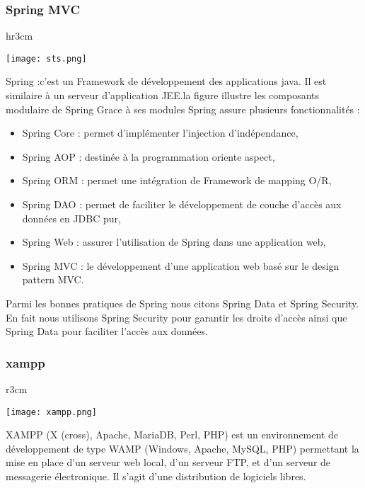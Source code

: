 \documentclass[../rapportdestage.tex]{subfiles}
\begin{document}
		
				
		
	
		
		
		\subsubsection{Spring MVC}
		
   \begin{wrapfigure}[4]{hr}{3cm}

\texttt{[image: sts.png]}
  \end{wrapfigure}
	
		Spring :c’est un Framework de développement des applications java. Il est similaire à un serveur d’application JEE.la figure  illustre les composants modulaire de Spring
		Grace à ses modules Spring assure plusieurs fonctionnalités :
		\begin{itemize}
\item Spring Core : permet d’implémenter l’injection d’indépendance,
\item Spring AOP : destinée à la programmation oriente aspect,
\item Spring ORM : permet une intégration de Framework de mapping O/R,
\item Spring DAO : permet de faciliter le développement de couche d’accès aux données en JDBC
pur,
\item Spring Web : assurer l’utilisation de Spring dans une application web,
\item Spring MVC : le développement d’une application web basé sur le design pattern MVC.
		
			
		
		\end{itemize}
Parmi les bonnes pratiques de Spring nous citons Spring Data et Spring Security. En fait nous
utilisons Spring Security pour garantir les droits d’accès ainsi que Spring Data pour faciliter l’accès
aux données.
\clearpage
		\subsubsection{xampp}
		
    \begin{wrapfigure}[4]{r}{3cm}

\texttt{[image: xampp.png]}
  
  
\end{wrapfigure}
		XAMPP (X (cross), Apache, MariaDB, Perl, PHP) est un environnement de
développement de type WAMP (Windows, Apache, MySQL, PHP) permettant la mise
en place d'un serveur web local, d'un serveur FTP, et d'un serveur de messagerie
électronique. Il s'agit d'une distribution de logiciels libres.
\end{document}
